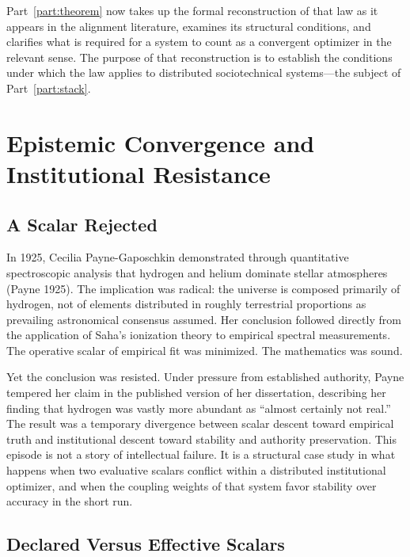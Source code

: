 \documentclass[12pt, oneside]{book}
\theoremstyle{plain}
\theoremstyle{definition}
\theoremstyle{remark}
\theoremstyle{definition}
\begin{document}
Part~\ref{part:theorem} now takes up the formal reconstruction of that law as it
appears in the alignment literature, examines its structural conditions, and clarifies
what is required for a system to count as a convergent optimizer in the relevant sense.
The purpose of that reconstruction is to establish the conditions under which the law
applies to distributed sociotechnical systems---the subject of Part~\ref{part:stack}.

\chapter{Epistemic Convergence and Institutional Resistance}
\label{ch:payne}

\section{A Scalar Rejected}

In 1925, Cecilia Payne-Gaposchkin demonstrated through quantitative spectroscopic
analysis that hydrogen and helium dominate stellar atmospheres (Payne 1925). The
implication was radical: the universe is composed primarily of hydrogen, not of
elements distributed in roughly terrestrial proportions as prevailing astronomical
consensus assumed. Her conclusion followed directly from the application of Saha's
ionization theory to empirical spectral measurements. The operative scalar of
empirical fit was minimized. The mathematics was sound.

Yet the conclusion was resisted. Under pressure from established authority, Payne
tempered her claim in the published version of her dissertation, describing her
finding that hydrogen was vastly more abundant as ``almost certainly not real.'' The
result was a temporary divergence between scalar descent toward empirical truth and
institutional descent toward stability and authority preservation. This episode is
not a story of intellectual failure. It is a structural case study in what happens
when two evaluative scalars conflict within a distributed institutional optimizer,
and when the coupling weights of that system favor stability over accuracy in the
short run.

\section{Declared Versus Effective Scalars}
\end{document}
